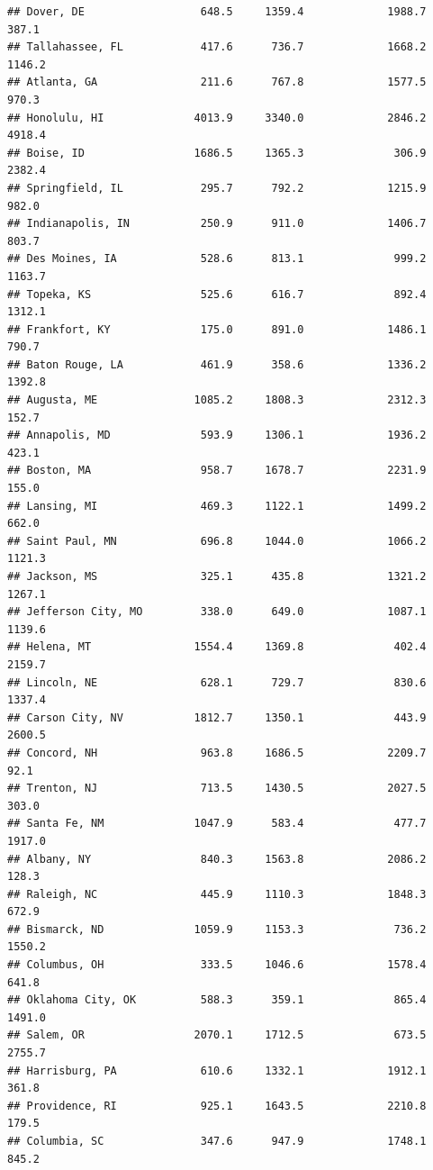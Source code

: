 \documentclass[
]{article}
\begin{document}
\begin{verbatim}
## Dover, DE                  648.5     1359.4             1988.7          387.1
## Tallahassee, FL            417.6      736.7             1668.2         1146.2
## Atlanta, GA                211.6      767.8             1577.5          970.3
## Honolulu, HI              4013.9     3340.0             2846.2         4918.4
## Boise, ID                 1686.5     1365.3              306.9         2382.4
## Springfield, IL            295.7      792.2             1215.9          982.0
## Indianapolis, IN           250.9      911.0             1406.7          803.7
## Des Moines, IA             528.6      813.1              999.2         1163.7
## Topeka, KS                 525.6      616.7              892.4         1312.1
## Frankfort, KY              175.0      891.0             1486.1          790.7
## Baton Rouge, LA            461.9      358.6             1336.2         1392.8
## Augusta, ME               1085.2     1808.3             2312.3          152.7
## Annapolis, MD              593.9     1306.1             1936.2          423.1
## Boston, MA                 958.7     1678.7             2231.9          155.0
## Lansing, MI                469.3     1122.1             1499.2          662.0
## Saint Paul, MN             696.8     1044.0             1066.2         1121.3
## Jackson, MS                325.1      435.8             1321.2         1267.1
## Jefferson City, MO         338.0      649.0             1087.1         1139.6
## Helena, MT                1554.4     1369.8              402.4         2159.7
## Lincoln, NE                628.1      729.7              830.6         1337.4
## Carson City, NV           1812.7     1350.1              443.9         2600.5
## Concord, NH                963.8     1686.5             2209.7           92.1
## Trenton, NJ                713.5     1430.5             2027.5          303.0
## Santa Fe, NM              1047.9      583.4              477.7         1917.0
## Albany, NY                 840.3     1563.8             2086.2          128.3
## Raleigh, NC                445.9     1110.3             1848.3          672.9
## Bismarck, ND              1059.9     1153.3              736.2         1550.2
## Columbus, OH               333.5     1046.6             1578.4          641.8
## Oklahoma City, OK          588.3      359.1              865.4         1491.0
## Salem, OR                 2070.1     1712.5              673.5         2755.7
## Harrisburg, PA             610.6     1332.1             1912.1          361.8
## Providence, RI             925.1     1643.5             2210.8          179.5
## Columbia, SC               347.6      947.9             1748.1          845.2

\end{verbatim}
\end{document}
